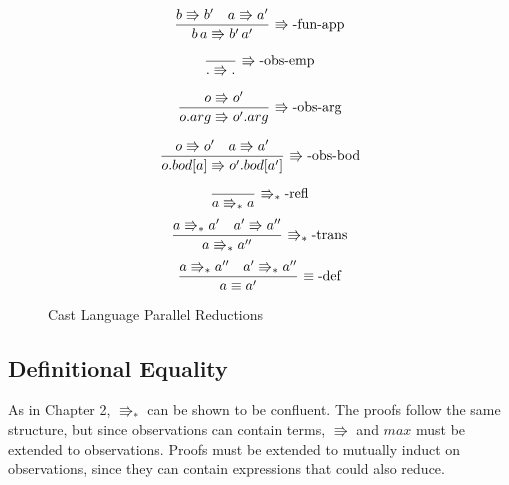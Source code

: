 \begin{figure}
\[
\frac{b\Rrightarrow b'\quad a\Rrightarrow a'}{b\,a\Rrightarrow b'\,a'}\,\operatorname{\Rrightarrow-fun-app}
\]

\[
\frac{\,}{.\Rrightarrow.}\,\operatorname{\Rrightarrow-obs-emp}
\]

\[
\frac{o\Rrightarrow o'}{o.arg\Rrightarrow o'.arg}\,\operatorname{\Rrightarrow-obs-arg}
\]

\[
\frac{o\Rrightarrow o'\quad a\Rrightarrow a'}{o.bod[a]\Rrightarrow o'.bod[a']}\,\operatorname{\Rrightarrow-obs-bod}
\]

\[
\frac{\,}{a\Rrightarrow_{\ast}a}\,\operatorname{\Rrightarrow_{\ast}-refl}
\]
\[
\frac{a\Rrightarrow_{\ast}a'\quad a'\Rrightarrow a''}{a\Rrightarrow_{\ast}a''}\,\operatorname{\Rrightarrow_{\ast}-trans}
\]
\[
\frac{a\Rrightarrow_{\ast}a''\quad a'\Rrightarrow_{\ast}a''}{a\equiv a'}\,\operatorname{\equiv-def}
\]

\caption{Cast Language Parallel Reductions}
\label{fig:cast-reduction}
\end{figure}

\subsection{Definitional Equality}


As in Chapter 2, $\Rrightarrow_{*}$ can be shown to be confluent.
The proofs follow the same structure, but since observations can contain terms, $\Rrightarrow$ and $max$ must be extended to observations.
Proofs must be extended to mutually induct on observations, since they can contain expressions that could also reduce.

